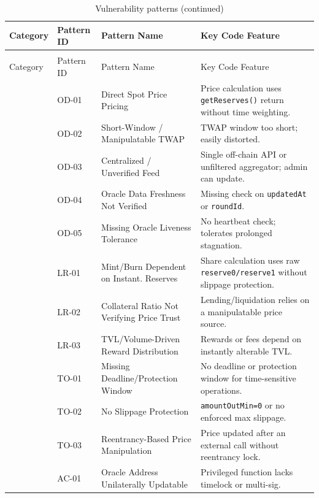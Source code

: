 \documentclass[10pt]{article}
\begin{document}
\begin{xltabular}{\textwidth}{
  >{\raggedright\arraybackslash}p{2.1cm}
  >{\raggedright\arraybackslash}p{1.1cm}
  >{\raggedright\arraybackslash}p{4.7cm}
  >{\raggedright\arraybackslash}X
}
\caption{Vulnerability patterns}\label{tab:patterns}\\
\toprule
Category & Pattern ID & Pattern Name & Key Code Feature \\
\midrule
\endfirsthead
\caption{Vulnerability patterns (continued)}\\
\toprule
Category & Pattern ID & Pattern Name & Key Code Feature \\
\midrule
\endhead
\bottomrule
\endfoot
\bottomrule
\endlastfoot
{} & OD-01 & Direct Spot Price Pricing & Price calculation uses \texttt{getReserves()} return without time weighting. \\
& OD-02 & Short-Window / Manipulatable TWAP & TWAP window too short; easily distorted. \\
& OD-03 & Centralized / Unverified Feed & Single off-chain API or unfiltered aggregator; admin can update. \\
& OD-04 & Oracle Data Freshness Not Verified & Missing check on \texttt{updatedAt} or \texttt{roundId}. \\
& OD-05 & Missing Oracle Liveness Tolerance & No heartbeat check; tolerates prolonged stagnation. \\
\midrule
{} & LR-01 & Mint/Burn Dependent on Instant. Reserves & Share calculation uses raw \texttt{reserve0/reserve1} without slippage protection. \\
& LR-02 & Collateral Ratio Not Verifying Price Trust & Lending/liquidation relies on a manipulatable price source. \\
& LR-03 & TVL/Volume-Driven Reward Distribution & Rewards or fees depend on instantly alterable TVL. \\
\midrule
{} & TO-01 & Missing Deadline/Protection Window & No deadline or protection window for time-sensitive operations. \\
& TO-02 & No Slippage Protection & \texttt{amountOutMin=0} or no enforced max slippage. \\
& TO-03 & Reentrancy-Based Price Manipulation & Price updated after an external call without reentrancy lock. \\
\midrule
{} & AC-01 & Oracle Address Unilaterally Updatable & Privileged function lacks timelock or multi-sig. \\

\end{xltabular}
\end{document}
